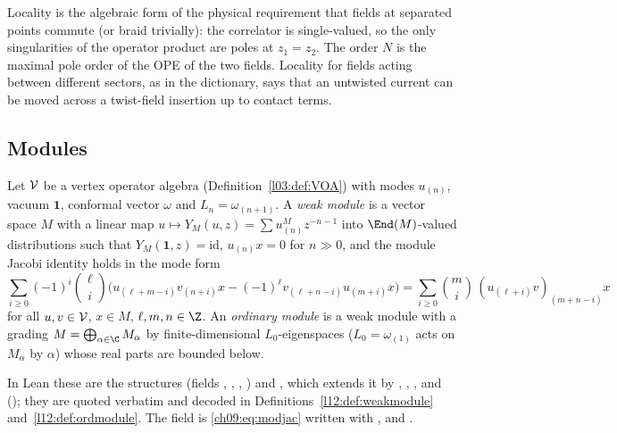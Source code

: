 \begin{physics}
Locality is the algebraic form of the physical requirement that fields at separated points commute (or braid trivially): the correlator is single-valued, so the only singularities of the operator product are poles at $z_1=z_2$. The order $N$ is the maximal pole order of the OPE of the two fields. Locality for fields acting between different sectors, as in the dictionary, says that an untwisted current can be moved across a twist-field insertion up to contact terms.
\end{physics}

\subsection{Modules}

\begin{definition}\label{ch09:def:module}
Let $\mathcal{V}$ be a vertex operator algebra (Definition~\ref{l03:def:VOA}) with modes $u_{(n)}$, vacuum
$\mathbf 1$, conformal vector $\omega$ and $L_n=\omega_{(n+1)}$. A \emph{weak module} is a vector
space $M$ with a linear map $u\mapsto Y_M(u,z)=\sum u^M_{(n)}z^{-n-1}$ into $\End(M)$-valued
distributions such that $Y_M(\mathbf 1,z)=\mathrm{id}$, $u_{(n)}x=0$ for $n\gg0$, and the module
Jacobi identity holds in the mode form
\begin{equation}\label{ch09:eq:modjac}
\sum_{i\ge0}(-1)^i\binom{\ell}{i}\Big(u_{(\ell+m-i)}v_{(n+i)}x-(-1)^\ell v_{(\ell+n-i)}u_{(m+i)}x\Big)
=\sum_{i\ge0}\binom{m}{i}\,(u_{(\ell+i)}v)_{(m+n-i)}x
\end{equation}
for all $u,v\in\mathcal{V}$, $x\in M$, $\ell,m,n\in\Z$. An \emph{ordinary module} is a weak module
with a grading $M=\bigoplus_{\alpha\in\C}M_\alpha$ by finite-dimensional $L_0$-eigenspaces
($L_0=\omega_{(1)}$ acts on $M_\alpha$ by $\alpha$) whose real parts are bounded below.
\end{definition}

In Lean these are the structures  (fields , ,
, ) and , which extends it by ,
, ,  and 
(); they are quoted verbatim and decoded in
Definitions~\ref{l12:def:weakmodule} and~\ref{l12:def:ordmodule}. The field  is
\eqref{ch09:eq:modjac} written with ,  and .

